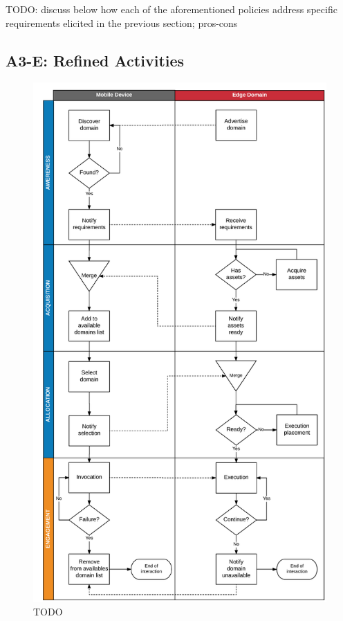 TODO: discuss below how each of the aforementioned policies address specific requirements elicited in the previous section; pros-cons

\subsection{A3-E: Refined Activities}\label{sec:a3-e-activities}

\begin{figure}
  \includegraphics[height=\textheight]{figs/activities.png}
  \caption{TODO}
  \label{fig:activities}
\end{figure}

